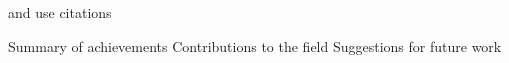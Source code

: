\documentclass[english, ing, kiv, he, iso690alph, pdf, viewonly]{fasthesis}
\begin{document}
and use citations





Summary of achievements
Contributions to the field
Suggestions for future work


%
%
%
%
\backmatter
\printbibliography
\listoffigures
\listoftables
\listoflistings
%
%
\setbackpageqrcode
\backpage
\end{document}
